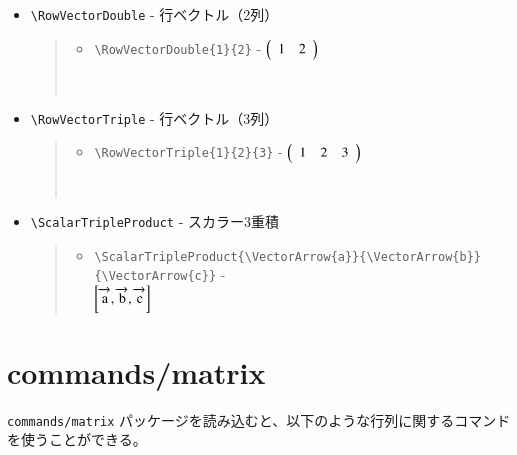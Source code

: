 \documentclass[oneside,10pt,a4paper]{jsarticle}
\begin{document}
\begin{itemize}
\begin{quote}
        \,
      \end{quote}
    \item \verb|\RowVectorDouble| - 行ベクトル（2列）
      \begin{quote}
        \Example
        \begin{itemize}
          \item \verb|\RowVectorDouble{1}{2}| - $\left( \begin{array}{cc} 1 & 2 \end{array} \right)$
        \end{itemize}
        \,
      \end{quote}
    \item \verb|\RowVectorTriple| - 行ベクトル（3列）
      \begin{quote}
        \Example
        \begin{itemize}
          \item \verb|\RowVectorTriple{1}{2}{3}| - $\left( \begin{array}{ccc} 1 & 2 & 3 \end{array} \right)$
        \end{itemize}
        \,
      \end{quote}
    \item \verb|\ScalarTripleProduct| - スカラー3重積
      \begin{quote}
        \Example
        \begin{itemize}
          \item \verb|\ScalarTripleProduct{\VectorArrow{a}}{\VectorArrow{b}}{\VectorArrow{c}}| - \\ $\left[ \overrightarrow{\mathstrut \mathrm{a}}, \overrightarrow{\mathstrut \mathrm{b}}, \overrightarrow{\mathstrut \mathrm{c}} \right]$
        \end{itemize}
      \end{quote}
  \end{itemize}

  \section{commands/matrix}

  \verb|commands/matrix| パッケージを読み込むと、以下のような行列に関するコマンドを使うことができる。
\end{document}
